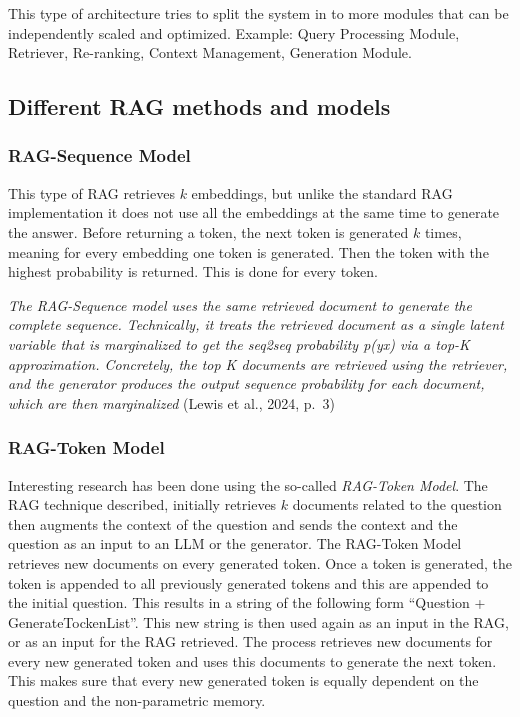 \documentclass{wseas}
\begin{document}
This type of architecture tries to split the system in to more modules
that can be independently scaled and optimized. Example: Query
Processing Module, Retriever, Re-ranking, Context Management, Generation
Module.

\subsection{Different RAG methods and
models}

\subsubsection{RAG-Sequence Model}

This type of RAG retrieves \(k\) embeddings, but unlike the standard RAG
implementation it does not use all the embeddings at the same time to
generate the answer. Before returning a token, the next token is
generated \(k\) times, meaning for every embedding one token is
generated. Then the token with the highest probability is returned. This
is done for every token.

\emph{The RAG-Sequence model uses the same retrieved document to
generate the complete sequence. Technically, it treats the retrieved
document as a single latent variable that is marginalized to get the
seq2seq probability p(y\textbar x) via a top-K approximation.
Concretely, the top K documents are retrieved using the retriever, and
the generator produces the output sequence probability for each
document, which are then marginalized} (Lewis et al., 2024, p.~3) \cite{cite3}

\subsubsection{RAG-Token Model}

Interesting research has been done using the so-called \emph{RAG-Token
Model}. The RAG technique described, initially retrieves \(k\) documents
related to the question then augments the context of the question and
sends the context and the question as an input to an LLM or the
generator. The RAG-Token Model retrieves new documents on every
generated token. Once a token is generated, the token is appended to all
previously generated tokens and this are appended to the initial
question. This results in a string of the following form ``Question +
GenerateTockenList''. This new string is then used again as an input in
the RAG, or as an input for the RAG retrieved. The process retrieves new
documents for every new generated token and uses this documents to
generate the next token. This makes sure that every new generated token
is equally dependent on the question and the non-parametric memory.
\end{document}
